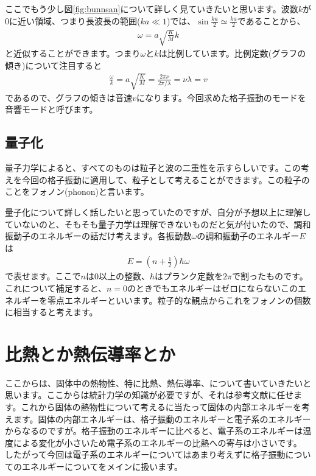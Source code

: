 \documentclass[10pt,b5paper,papersize,dvipdfmx]{jsbook}
\begin{document}
ここでもう少し図\ref{fig:bunnsan}について詳しく見ていきたいと思います。波数$k$が$0$に近い領域、つまり長波長の範囲($ka \ll 1$)では、$\sin \frac{ka}{2} \simeq \frac{ka}{2}$であることから、
\begin{align}
  \omega = a \sqrt{\frac{K}{M}}k
\end{align}
と近似することができます。つまり$\omega$と$k$は比例しています。比例定数(グラフの傾き)について注目すると
\begin{align}
  \frac{\omega}{k} =a \sqrt{\frac{K}{M}}= \frac{2\pi\nu}{2\pi/\lambda} = \nu \lambda = v
\end{align}
であるので、グラフの傾きは音速$v$になります。今回求めた格子振動のモードを音響モードと呼びます。

\subsection{量子化}
量子力学によると、すべてのものは粒子と波の二重性を示すらしいです。この考えを今回の格子振動に適用して、粒子として考えることができます。この粒子のことをフォノン(phonon)と言います。\par
量子化について詳しく話したいと思っていたのですが、自分が予想以上に理解していないのと、そもそも量子力学は理解できないものだと気が付いたので、調和振動子のエネルギーの話だけ考えます。各振動数$\omega$の調和振動子のエネルギー$E$は
\begin{align}
  E = \left(n + \frac{1}{2}\right)\hbar \omega
\end{align}
で表せます。ここで$n$は0以上の整数、$\hbar$はプランク定数を$2\pi$で割ったものです。これについて補足すると、$n = 0$のときでもエネルギーはゼロにならないこのエネルギーを零点エネルギーといいます。粒子的な観点からこれをフォノンの個数に相当すると考えます。







\section{比熱とか熱伝導率とか}
ここからは、固体中の熱物性、特に比熱、熱伝導率、について書いていきたいと思います。ここからは統計力学の知識が必要ですが、それは参考文献に任せます。これから固体の熱物性について考えるに当たって固体の内部エネルギーを考えます。固体の内部エネルギーは、格子振動のエネルギーと電子系のエネルギーからなるのですが。格子振動のエネルギーに比べると、電子系のエネルギーは温度による変化が小さいため電子系のエネルギーの比熱への寄与は小さいです。
したがって今回は電子系のエネルギーについてはあまり考えずに格子振動についてのエネルギーについてをメインに扱います。
\end{document}
